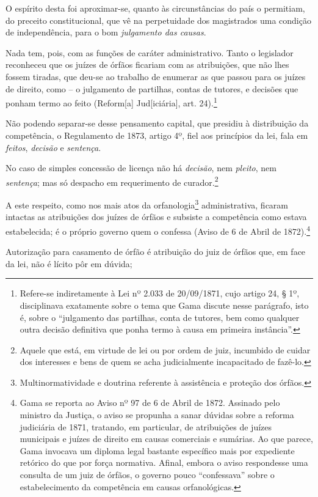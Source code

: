 O espírito desta foi aproximar-se, quanto às circunstâncias do país o
permitiam, do preceito constitucional, que vê na perpetuidade dos
magistrados uma condição de independência, para o bom \emph{julgamento
das causas}.

Nada tem, pois, com as funções de caráter administrativo. Tanto o
legislador reconheceu que os juízes de órfãos ficariam com as
atribuições, que não lhes fossem tiradas, que deu-se ao trabalho de
enumerar as que passou para os juízes de direito, como -- o julgamento
de partilhas, contas de tutores, e decisões que ponham termo ao feito
(Reform{[}a{]} Jud{[}iciária{]}, art. 24).\footnote{Refere-se
  indiretamente à Lei nº 2.033 de 20/09/1871, cujo artigo 24, § 1º,
  disciplinava exatamente sobre o tema que Gama discute nesse parágrafo,
  isto é, sobre o ``julgamento das partilhas, conta de tutores, bem como
  qualquer outra decisão definitiva que ponha termo à causa em primeira
  instância''.}

Não podendo separar-se desse pensamento capital, que presidiu à
distribuição da competência, o Regulamento de 1873, artigo 4º, fiel aos
princípios da lei, fala em \emph{feitos}, \emph{decisão} e
\emph{sentença}.

No caso de simples concessão de licença não há \emph{decisão}, nem
\emph{pleito}, nem \emph{sentença}; mas só despacho em requerimento de
curador.\footnote{Aquele que está, em virtude de lei ou por ordem de
  juiz, incumbido de cuidar dos interesses e bens de quem se acha
  judicialmente incapacitado de fazê-lo.}

A este respeito, como nos mais atos da orfanologia\footnote{Multinormatividade
  e doutrina referente à assistência e proteção dos órfãos.}
administrativa, ficaram intactas as atribuições dos juízes de órfãos e
subsiste a competência como estava estabelecida; é o próprio governo
quem o confessa (Aviso de 6 de Abril de 1872).\footnote{Gama se reporta
  ao Aviso nº 97 de 6 de Abril de 1872. Assinado pelo ministro da
  Justiça, o aviso se propunha a sanar dúvidas sobre a reforma
  judiciária de 1871, tratando, em particular, de atribuições de juízes
  municipais e juízes de direito em causas comerciais e sumárias. Ao que
  parece, Gama invocava um diploma legal bastante específico mais por
  expediente retórico do que por força normativa. Afinal, embora o aviso
  respondesse uma consulta de um juiz de órfãos, o governo pouco
  ``confessava'' sobre o estabelecimento da competência em causas
  orfanológicas.}

Autorização para casamento de órfão é atribuição do juiz de órfãos que,
em face da lei, não é lícito pôr em dúvida;

